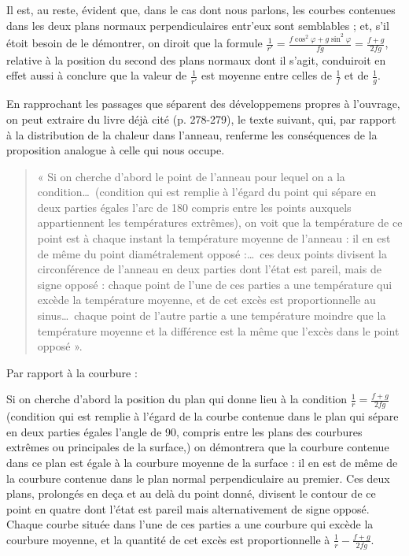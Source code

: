 \documentclass[11pt,a4paper]{article}
\begin{document}

Il est, au reste, évident que, dans le cas dont nous parlons, les courbes
contenues dans les deux plans normaux perpendiculaires entr'eux sont
semblables ; et, s'il étoit besoin de le démontrer, on diroit que la formule
$\frac{1}{r'} = \frac{f\cos^{2}\varphi + g\sin^{2}\varphi}{fg} =
\frac{f+g}{2fg}$, relative à la position du second des plans normaux dont il
s'agit, conduiroit en effet aussi à conclure que la valeur de $\frac{1}{r'}$
est moyenne entre celles de $\frac{1}{f}$ et de $\frac{1}{g}$.

En rapprochant les passages que séparent des développemens propres à
l'ouvrage, on peut extraire du livre déjà cité (p. 278-279), le texte
suivant, qui, par rapport à la distribution de la chaleur dans l'anneau,
renferme les conséquences de la proposition analogue à celle qui nous occupe.

\begin{quote}
« Si on cherche d'abord le point de l'anneau pour lequel on a la
condition\ldots\ (condition qui est remplie à l'égard du point qui sépare en
deux parties égales l'arc de 180 compris entre les points auxquels
appartiennent les températures extrêmes), on voit que la température de ce
point est à chaque instant la température moyenne de l'anneau : il en est de
même du point diamétralement opposé :\ldots\ ces deux points divisent la
circonférence de l'anneau en deux parties dont l'état est pareil, mais de
signe opposé : chaque point de l'une de ces parties a une température qui
excède la température moyenne, et  de cet excès est
proportionnelle au sinus\ldots\ chaque point de l'autre partie a une
température moindre que la température moyenne et la différence est la même
que l'excès dans le point opposé ».
\end{quote}


Par rapport à la courbure :

Si on cherche d'abord la position du plan qui donne lieu à la condition
$\frac{1}{r} = \frac{f+g}{2fg}$ (condition qui est remplie à l'égard de la
courbe contenue dans le plan qui sépare en deux parties égales l'angle de 90,
compris entre les plans des courbures extrêmes ou principales de la surface,)
on démontrera que la courbure contenue dans ce plan est égale à la courbure
moyenne de la surface : il en est de même de la courbure contenue dans le
plan normal perpendiculaire au premier. Ces deux plans, prolongés en deça et
au delà du point donné, divisent le contour de ce point en quatre
 dont l'état est pareil mais alternativement de signe
opposé. Chaque courbe située dans l'une de ces parties a une courbure qui
excède la courbure moyenne, et la quantité de cet excès est proportionnelle à
$\frac{1}{r} - \frac{f+g}{2fg}$.
\end{document}
